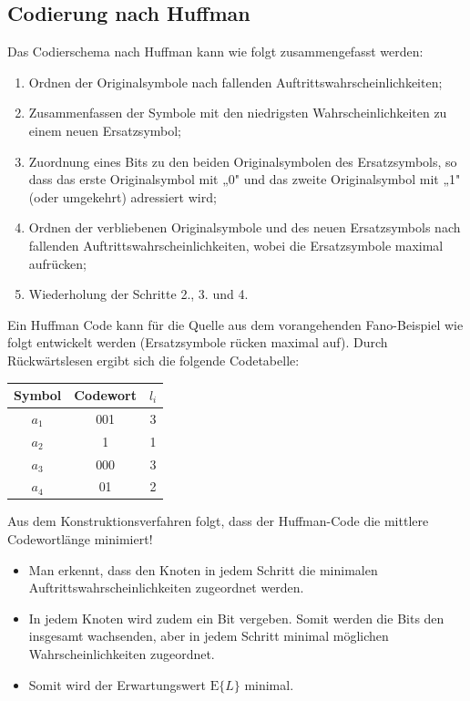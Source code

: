 \subsection{Codierung nach Huffman}
\label{sec:huffman}

Das Codierschema nach Huffman kann wie folgt zusammengefasst werden:

\begin{enumerate}
  \item Ordnen der Originalsymbole nach fallenden Auftrittswahrscheinlichkeiten;
  \item Zusammenfassen der Symbole mit den niedrigsten Wahrscheinlichkeiten zu einem neuen Ersatzsymbol;
  \item Zuordnung eines Bits zu den beiden Originalsymbolen des Ersatzsymbols, so dass das erste Originalsymbol mit „0" und das zweite Originalsymbol mit „1" (oder umgekehrt) adressiert wird;
  \item Ordnen der verbliebenen Originalsymbole und des neuen Ersatzsymbols nach fallenden Auftrittswahrscheinlichkeiten, wobei die Ersatzsymbole maximal aufrücken;
  \item Wiederholung der Schritte 2., 3. und 4.
\end{enumerate}

\begin{beispiel}
Ein Huffman Code kann für die Quelle aus dem vorangehenden Fano-Beispiel wie folgt entwickelt werden (Ersatzsymbole rücken maximal auf). Durch Rückwärtslesen ergibt sich die folgende Codetabelle:

\begin{center}
\begin{tabular}{c|c|c}
Symbol & Codewort & $l_i$ \\
\hline
$a_1$ & 001 & 3 \\
$a_2$ & 1   & 1 \\
$a_3$ & 000 & 3 \\
$a_4$ & 01  & 2 \\
\end{tabular}
\end{center}

\end{beispiel}

Aus dem Konstruktionsverfahren folgt, dass der Huffman-Code die mittlere Codewortlänge minimiert!

\begin{itemize}
  \item Man erkennt, dass den Knoten in jedem Schritt die minimalen Auftrittswahrscheinlichkeiten zugeordnet werden.
  \item In jedem Knoten wird zudem ein Bit vergeben. Somit werden die Bits den insgesamt wachsenden, aber in jedem Schritt minimal möglichen Wahrscheinlichkeiten zugeordnet.
  \item Somit wird der Erwartungswert $\mathrm{E}\{L\}$ minimal.
\end{itemize}

